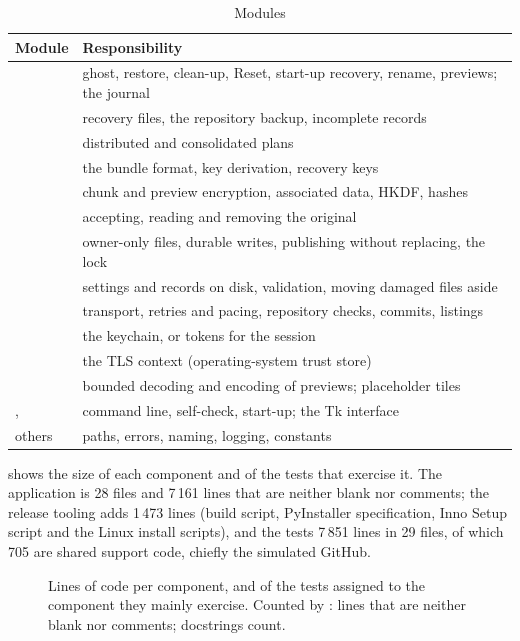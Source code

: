 \begin{table}[t]
\caption{Modules}\label{tab:modules}
\centering\footnotesize
\begin{tabular}{@{}L{17mm}L{63mm}@{}}
\toprule
\textbf{Module} & \textbf{Responsibility} \\
\midrule
{} & ghost, restore, clean-up, Reset, start-up recovery, rename, previews; the journal \\ \addlinespace[1.6pt]
 & recovery files, the repository backup, incomplete records \\ \addlinespace[1.6pt]
 & distributed and consolidated plans \\ \addlinespace[1.6pt]
 & the bundle format, key derivation, recovery keys \\ \addlinespace[1.6pt]
 & chunk and preview encryption, associated data, HKDF, hashes \\ \addlinespace[1.6pt]
 & accepting, reading and removing the original \\ \addlinespace[1.6pt]
 & owner-only files, durable writes, publishing without replacing, the lock \\ \addlinespace[1.6pt]
 & settings and records on disk, validation, moving damaged files aside \\ \addlinespace[1.6pt]
 & transport, retries and pacing, repository checks, commits, listings \\ \addlinespace[1.6pt]
 & the keychain, or tokens for the session \\ \addlinespace[1.6pt]
 & the TLS context (operating-system trust store) \\ \addlinespace[1.6pt]
 & bounded decoding and encoding of previews; placeholder tiles \\ \addlinespace[1.6pt]
,  & command line, self-check, start-up; the Tk interface \\ \addlinespace[1.6pt]
others & paths, errors, naming, logging, constants \\
\bottomrule
\end{tabular}
\end{table}

 shows the size of each component and of the tests that exercise it. The
application is 28 files and 7\,161 lines that are neither blank nor comments; the release tooling
adds 1\,473 lines (build script, PyInstaller specification, Inno Setup script and the Linux install
scripts), and the tests 7\,851 lines in 29 files, of which 705 are shared support code, chiefly the
simulated GitHub.

\begin{figure}[t]
\centering

\caption{Lines of code per component, and of the tests assigned to the component they mainly
exercise. Counted by : lines that are neither blank nor comments;
docstrings count.}
\label{fig:size}
\end{figure}
